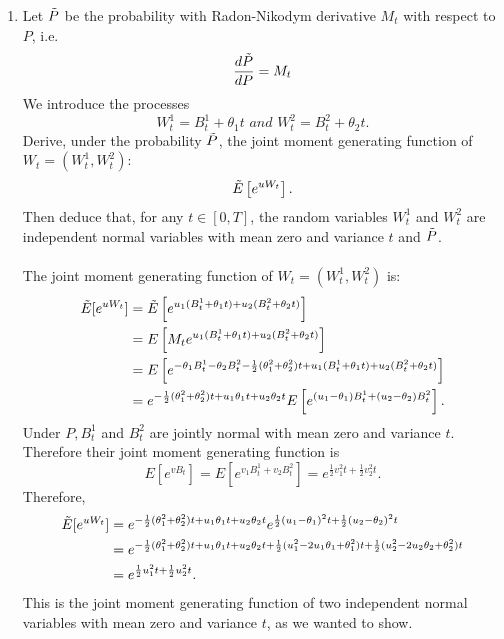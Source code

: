 \documentclass[handout,8pt]{beamer}
\begin{document}
\begin{frame}[allowframebreaks]{ }
\begin{enumerate}
\begin{enumerate}
        \item Let $\Tilde{P}$ be the probability with Radon-Nikodym derivative $M_t$ with respect to $P$, i.e.
        \begin{equation*}
            \frac{d\Tilde{P}}{dP} = M_t
        \end{equation*}
        We introduce the processes
        \begin{equation*}
            W_t^1 = B_t^1 + \theta_1 t \textit{ and } W_t^2 = B_t^2 + \theta_2 t.
        \end{equation*}
        Derive, under the probability $\Tilde{P}$, the joint moment generating function of $W_t=(W_t^1, W_t^2)$:
        \begin{equation*}
            \Tilde{E}\left[e^{uW_t}\right].
        \end{equation*}
        Then deduce that, for any $t\in[0,T]$, the random variables $W_t^1$ and $W_t^2$ are independent normal variables with mean zero and variance $t$ and $\Tilde{P}$.\\\\
        The joint moment generating function of $W_t=(W_t^1,W_t^2)$ is:
        \begin{align*}
            \Tilde{E}[e^{uW_t}] &= \Tilde{E}\left[e^{u_1(B_t^1+\theta_1t) + u_2(B_t^2 + \theta_2t)}\right]\\
            &= E\left[M_t e^{u_1(B_t^1 + \theta_1t) + u_2(B_t^2 +\theta_2t)}\right]\\
            &= E\left[e^{-\theta_1B_t^1 - \theta_2B_t^2 - \frac{1}{2}(\theta_1^2 + \theta_2^2)t + u_1(B_t^1 + \theta_1t) + u_2(B_t^2 +\theta_2t)}\right]\\
            &= e^{-\frac{1}{2}(\theta_1^2 + \theta_2^2)t + u_1\theta_1t + u_2\theta_2t}E\left[e^{(u_1 - \theta_1)B_t^1 + (u_2 -\theta_2)B_t^2}\right].
        \end{align*}
        Under $P, B_t^1$ and $B_t^2$ are jointly normal with mean zero and variance $t$. Therefore their joint moment generating function is
        \begin{equation*}
            E[e^{vB_t}]=E\left[e^{v_1B_t^1 + v_2B_t^2}\right] = e^{\frac{1}{2}v_1^2t + \frac{1}{2}v_2^2t}.
        \end{equation*}
        Therefore,
        \begin{align*}
            \Tilde{E}[e^{uW_t}] &= e^{-\frac{1}{2}(\theta_1^2 +\theta_2^2)t + u_1\theta_1t + u_2\theta_2t}e^{\frac{1}{2}(u_1-\theta_1)^2t + \frac{1}{2}(u_2 - \theta_2)^2t}\\
            &= e^{-\frac{1}{2}(\theta_1^2 +\theta_2^2)t + u_1\theta_1t + u_2\theta_2t + \frac{1}{2}(u_1^2-2u_1\theta_1+\theta_1^2)t + \frac{1}{2}(u_2^2 - 2u_2\theta_2 + \theta_2^2)t}\\
            &= e^{\frac{1}{2}u_1^2t + \frac{1}{2}u_2^2t}.
        \end{align*}
        This is the joint moment generating function of two independent normal variables with mean zero and variance $t$, as we wanted to show.
        

\end{enumerate}
\end{enumerate}
\end{frame}
\end{document}
